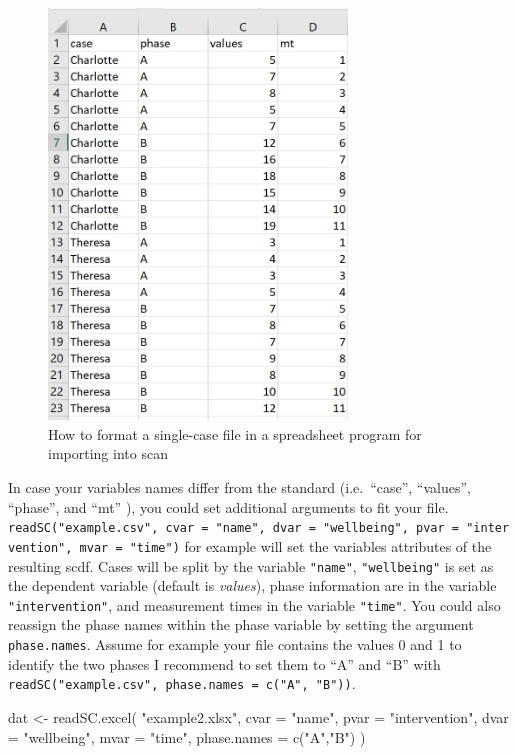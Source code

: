 \documentclass[
]{book}
\newenvironment{Shaded}{\begin{snugshade}}{\end{snugshade}}
\newcommand{\AttributeTok}[1]{\textcolor[rgb]{0.77,0.63,0.00}{#1}}
\newcommand{\FunctionTok}[1]{\textcolor[rgb]{0.00,0.00,0.00}{#1}}
\newcommand{\NormalTok}[1]{#1}
\newcommand{\OtherTok}[1]{\textcolor[rgb]{0.56,0.35,0.01}{#1}}
\newcommand{\StringTok}[1]{\textcolor[rgb]{0.31,0.60,0.02}{#1}}
\begin{document}
\begin{figure}
\centering
\includegraphics[width=3.125in,height=\textheight]{images/readSC.jpg}
\caption{How to format a single-case file in a spreadsheet program for importing into scan}
\end{figure}

In case your variables names differ from the standard (i.e.~``case'', ``values'', ``phase'', and ``mt'' ), you could set additional arguments to fit your file. \texttt{readSC("example.csv",\ cvar\ =\ "name",\ dvar\ =\ "wellbeing",\ pvar\ =\ "intervention",\ mvar\ =\ "time")} for example will set the variables attributes of the resulting scdf. Cases will be split by the variable \texttt{"name"}, \texttt{"wellbeing"} is set as the dependent variable (default is \emph{values}), phase information are in the variable \texttt{"intervention"}, and measurement times in the variable \texttt{"time"}. You could also reassign the phase names within the phase variable by setting the argument \texttt{phase.names}. Assume for example your file contains the values 0 and 1 to identify the two phases I recommend to set them to ``A'' and ``B'' with \texttt{readSC("example.csv",\ phase.names\ =\ c("A",\ "B"))}.

\begin{Shaded}
\begin{Highlighting}[]
\NormalTok{dat }\OtherTok{\textless{}{-}} \FunctionTok{readSC.excel}\NormalTok{(}
  \StringTok{"example2.xlsx"}\NormalTok{, }\AttributeTok{cvar =} \StringTok{"name"}\NormalTok{, }\AttributeTok{pvar =} \StringTok{"intervention"}\NormalTok{, }
  \AttributeTok{dvar =} \StringTok{"wellbeing"}\NormalTok{, }\AttributeTok{mvar =} \StringTok{"time"}\NormalTok{, }\AttributeTok{phase.names =} \FunctionTok{c}\NormalTok{(}\StringTok{"A"}\NormalTok{,}\StringTok{"B"}\NormalTok{)}
\NormalTok{)}
\end{Highlighting}
\end{Shaded}
\end{document}
